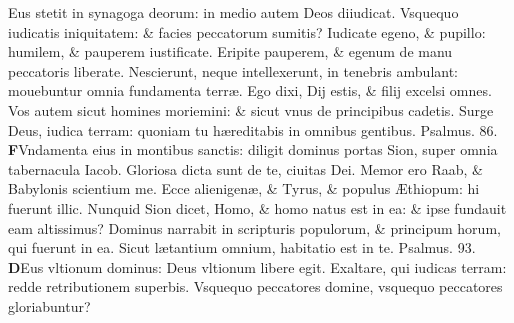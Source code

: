 \documentclass[a5paper,10pt]{book}
\def\ae{æ}
\def\AE{Æ}
\begin{document}
\begin{multicols*}{2}
Eus stetit in synagoga deorum: in medio autem Deos diiudicat.
\newline \color{red} V\color{black}squequo iudicatis iniquitatem: \& facies peccatorum sumitis?
\newline \color{red} I\color{black}udicate egeno, \& pupillo: humilem, \& pauperem iustificate.
\newline \color{red} E\color{black}ripite pauperem, \& egenum de manu peccatoris liberate.
\newline \color{red} N\color{black}escierunt, neque intellexerunt, in tenebris ambulant: mouebuntur omnia fundamenta terr\ae .
\newline \color{red} E\color{black}go dixi, Dij estis, \& filij excelsi omnes.
\newline \color{red} V\color{black}os autem sicut homines moriemini: \& sicut vnus de principibus cadetis.
\newline \color{red} S\color{black}urge Deus, iudica terram: quoniam tu h\ae reditabis in omnibus gentibus.
\newline \color{red} Psalmus. \hypertarget{ps86}{86.} \color{black}
\vspace{-.25em}
\lettrine[lines=2]{\bfseries \color{red} F}{}Vndamenta eius in montibus sanctis: diligit dominus portas Sion, super omnia tabernacula Iacob.
\newline \color{red} G\color{black}loriosa dicta sunt de te, ciuitas Dei.
\newline \color{red} M\color{black}emor ero Raab, \& Babylonis scientium me.%
\newline \color{red} E\color{black}cce alienigen\ae , \& Tyrus, \& populus \AE thiopum: hi fuerunt illic.
\newline \color{red} N\color{black}unquid Sion dicet, Homo, \& homo natus est in ea: \& ipse fundauit eam altissimus?
\newline \color{red} D\color{black}ominus narrabit in scripturis populorum, \& principum horum, qui fuerunt in ea.
\newline \color{red} S\color{black}icut l\ae tantium omnium, habitatio est in te. \quad \color{red} Psalmus. \hypertarget{ps93}{93.} \color{black}
\vspace{-.25em}
\lettrine[lines=2]{\bfseries \color{red} D}{}Eus vltionum dominus: Deus vltionum libere egit.
\newline \color{red} E\color{black}xaltare, qui iudicas terram: redde retributionem superbis.
\newline \color{red} V\color{black}squequo peccatores domine, vsquequo peccatores gloriabuntur?

\end{multicols*}
\end{document}
